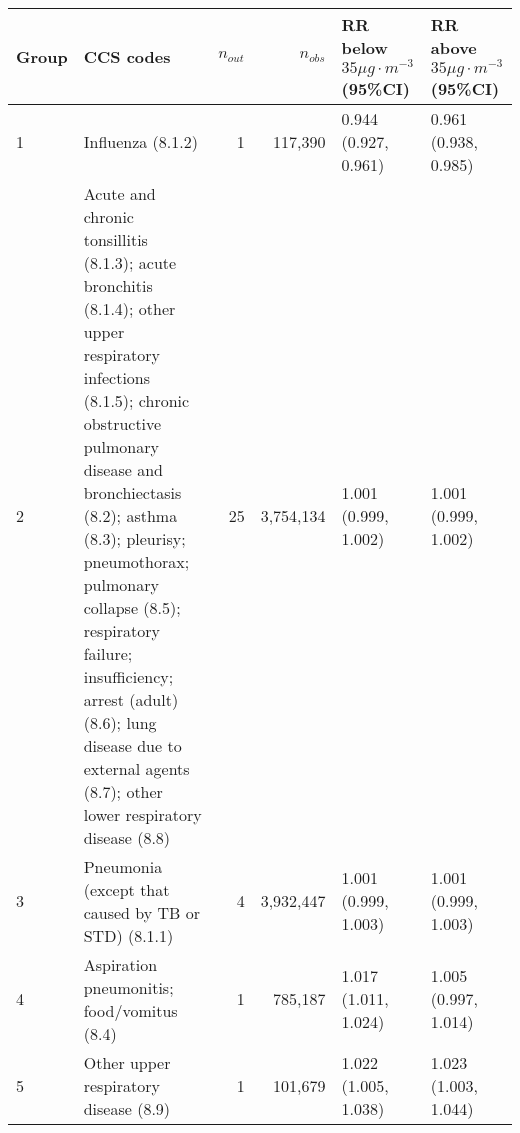 \begin{tabular}{lp{6.5cm}rrp{2.2cm}p{2.2cm}}
  \hline
Group & CCS codes & $n_{out}$ & $n_{obs}$ & RR below $35 \mu g \cdot m^{-3}$ (95\%CI) & RR above $35 \mu g \cdot m^{-3}$ (95\%CI) \\ 
  \hline
   1 & Influenza (8.1.2) &    1 & 117,390 & 0.944 (0.927, 0.961) & 0.961 (0.938, 0.985) \\ 
     2 & Acute and chronic tonsillitis (8.1.3); acute bronchitis (8.1.4); other upper respiratory infections (8.1.5); chronic obstructive pulmonary disease and bronchiectasis (8.2); asthma (8.3); pleurisy; pneumothorax; pulmonary collapse (8.5); respiratory failure; insufficiency; arrest (adult) (8.6); lung disease due to external agents (8.7); other lower respiratory disease (8.8) &   25 & 3,754,134 & 1.001 (0.999, 1.002) & 1.001 (0.999, 1.002) \\ 
     3 & Pneumonia (except that caused by TB or STD) (8.1.1) &    4 & 3,932,447 & 1.001 (0.999, 1.003) & 1.001 (0.999, 1.003) \\ 
     4 & Aspiration pneumonitis; food/vomitus (8.4) &    1 & 785,187 & 1.017 (1.011, 1.024) & 1.005 (0.997, 1.014) \\ 
     5 & Other upper respiratory disease (8.9) &    1 & 101,679 & 1.022 (1.005, 1.038) & 1.023 (1.003, 1.044) \\ 
   \hline
\end{tabular}

